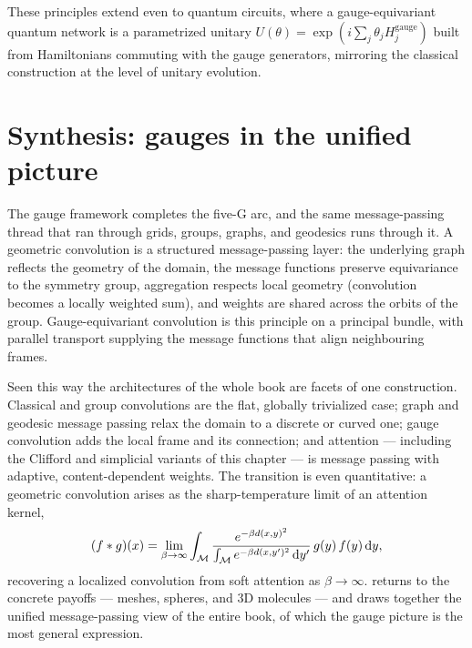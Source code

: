 These principles extend even to quantum circuits, where a gauge-equivariant
quantum network is a parametrized unitary $U(\theta) = \exp(i\sum_j \theta_j
H_j^{\text{gauge}})$ built from Hamiltonians commuting with the gauge generators,
mirroring the classical construction at the level of unitary evolution.

\section{Synthesis: gauges in the unified picture}
\label{sec:gauge:synthesis}

The gauge framework completes the five-G arc, and the same message-passing thread
that ran through grids, groups, graphs, and geodesics runs through it. A
geometric convolution is a structured message-passing layer: the underlying graph
reflects the geometry of the domain, the message functions preserve equivariance
to the symmetry group, aggregation respects local geometry (convolution becomes a
locally weighted sum), and weights are shared across the orbits of the group.
Gauge-equivariant convolution is this principle on a principal bundle, with
parallel transport supplying the message functions that align neighbouring
frames.

Seen this way the architectures of the whole book are facets of one construction.
Classical and group convolutions are the flat, globally trivialized case;
graph and geodesic message passing relax the domain to a discrete or curved one;
gauge convolution adds the local frame and its connection; and attention ---
including the Clifford and simplicial variants of this chapter --- is message
passing with adaptive, content-dependent weights. The transition is even
quantitative: a geometric convolution arises as the sharp-temperature limit of an
attention kernel,
\[
  (f * g)(x) = \lim_{\beta \to \infty} \int_{\mathcal{M}}
  \frac{e^{-\beta d(x, y)^2}}{\int_{\mathcal{M}} e^{-\beta d(x, y')^2}\, \mathrm{d}y'}\,
  g(y)\, f(y)\, \mathrm{d}y,
\]
recovering a localized convolution from soft attention as $\beta \to \infty$.
 returns to the concrete payoffs --- meshes, spheres, and
$3$D molecules --- and  draws together the unified
message-passing view of the entire book, of which the gauge picture is the most
general expression.
